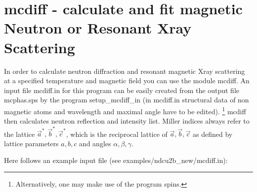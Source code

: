 \section{{\prg mcdiff} - calculate and fit  magnetic Neutron or Resonant Xray 
Scattering}\label{mcdiff}

In order to calculate neutron diffraction and resonant magnetic Xray scattering
at a specified temperature and magnetic field you can use the module {\prg mcdiff}.
An input file {\prg mcdiff.in } for this program can be easily created from
the output file {\prg mcphas.sps} by the program {\prg setup\_mcdiff\_in}
(in {\prg mcdiff.in } structural data of non magnetic atoms and wavelength
                        and maximal angle have to be edited).
\footnote{Alternatively, one may make use of the program {\prg spins}.} 
{\prg mcdiff} then calculates neutron reflection and intensity list.
Miller indices always refer to the lattice $\vec a^*, \vec b^*, \vec c^*$, which
is the reciprocal lattice of $\vec a, \vec b, \vec c$ as defined by lattice
parameters $a,b,c$ and angles $\alpha,\beta,\gamma$.

Here follows an example input file (see examples/ndcu2b\_new/mcdiff.in):

